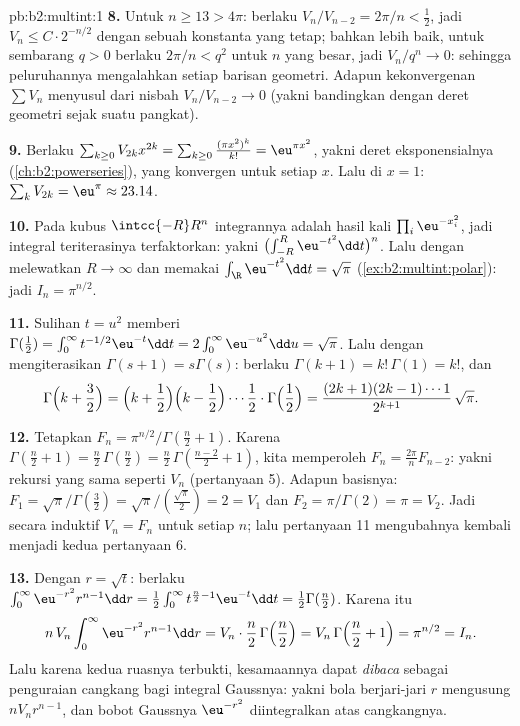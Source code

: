 \begin{solution}{pb:b2:multint:1}
\textbf{8.} Untuk $n \geq 13 > 4\pi$: berlaku $V_n/V_{n-2} = 2\pi/n <
\tfrac12$, jadi $V_{n} \leq C\cdot 2^{-n/2}$ dengan sebuah konstanta
yang tetap; bahkan lebih baik, untuk sembarang $q > 0$ berlaku $2\pi/n < q^2$ untuk $n$
yang besar, jadi $V_n/q^n \to 0$: sehingga peluruhannya mengalahkan setiap barisan
geometri. Adapun kekonvergenan $\sum V_n$ menyusul dari nisbah
$V_n/V_{n-2} \to 0$ (yakni bandingkan dengan deret geometri sejak
suatu pangkat).

\textbf{9.} Berlaku $\sum_{k\geq0}V_{2k}x^{2k} =
\sum_{k\geq0}\frac{(\pi x^2)^k}{k!} = \eu^{\pi x^2}$, yakni
deret eksponensialnya (\cref{ch:b2:powerseries}), yang konvergen untuk
setiap $x$. Lalu di $x = 1$: $\sum_kV_{2k} = \eu^\pi \approx
23.14$.

\textbf{10.} Pada kubus $\intcc{-R}R^n$ integrannya adalah
hasil kali $\prod_i\eu^{-x_i^2}$, jadi integral teriterasinya
terfaktorkan: yakni $\bigl(\int_{-R}^R\eu^{-t^2}\dd t\bigr)^n$.
Lalu dengan melewatkan $R \to \infty$ dan memakai
$\int_\R\eu^{-t^2}\dd t = \sqrt\pi$
(\cref{ex:b2:multint:polar}): jadi $I_n = \pi^{n/2}$.

\textbf{11.} Sulihan $t = u^2$ memberi $\Gamma(\tfrac12) =
\int_0^\infty t^{-1/2}\eu^{-t}\dd t =
2\int_0^\infty\eu^{-u^2}\dd u = \sqrt\pi$. Lalu dengan mengiterasikan
$\Gamma(s+1) = s\Gamma(s)$: berlaku $\Gamma(k+1) = k!\,\Gamma(1) =
k!$, dan
\[
\Gamma\Bigl(k + \frac32\Bigr)
= \Bigl(k + \frac12\Bigr)\Bigl(k - \frac12\Bigr)\cdots
\frac12\cdot\Gamma\Bigl(\frac12\Bigr)
= \frac{(2k+1)(2k-1)\cdots1}{2^{k+1}}\,\sqrt\pi .
\]

\textbf{12.} Tetapkan $F_n = \pi^{n/2}/\Gamma(\frac n2 + 1)$.
Karena $\Gamma(\frac n2 + 1) = \frac n2\,\Gamma(\frac n2) =
\frac n2\,\Gamma(\frac{n-2}2 + 1)$, kita memperoleh $F_n =
\frac{2\pi}nF_{n-2}$: yakni rekursi yang sama seperti $V_n$ (pertanyaan
5). Adapun basisnya: $F_1 = \sqrt\pi/\Gamma(\frac32) =
\sqrt\pi/(\frac{\sqrt\pi}2) = 2 = V_1$ dan $F_2 =
\pi/\Gamma(2) = \pi = V_2$. Jadi secara induktif $V_n = F_n$ untuk setiap
$n$; lalu pertanyaan 11 mengubahnya kembali menjadi kedua 
pertanyaan 6.

\textbf{13.} Dengan $r = \sqrt t$: berlaku $\int_0^\infty
\eu^{-r^2}r^{n-1}\dd r = \frac12\int_0^\infty
t^{\frac n2 - 1}\eu^{-t}\dd t = \frac12\Gamma(\frac n2)$.
Karena itu
\[
n\,V_n\int_0^\infty\eu^{-r^2}r^{n-1}\dd r
= V_n\cdot\frac n2\,\Gamma\Bigl(\frac n2\Bigr)
= V_n\,\Gamma\Bigl(\frac n2 + 1\Bigr) = \pi^{n/2} = I_n .
\]
Lalu karena kedua ruasnya terbukti, kesamaannya dapat \emph{dibaca} sebagai
penguraian cangkang bagi integral Gaussnya: yakni bola
berjari-jari $r$ mengusung  $nV_nr^{n-1}$, dan
bobot Gaussnya $\eu^{-r^2}$ diintegralkan atas cangkangnya.


\end{solution}
